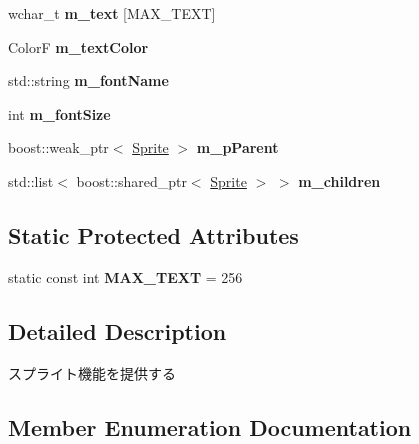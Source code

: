 \begin{DoxyCompactItemize}
\item 
wchar\+\_\+t {\bfseries m\+\_\+text} \mbox{[}M\+A\+X\+\_\+\+T\+E\+XT\mbox{]}\hypertarget{class_sprite_a7e22779568fcb5455c0c95b72e055b27}{}\label{class_sprite_a7e22779568fcb5455c0c95b72e055b27}

\item 
ColorF {\bfseries m\+\_\+text\+Color}\hypertarget{class_sprite_a5715eb71948a9edbd58d0e4bb6f55f3e}{}\label{class_sprite_a5715eb71948a9edbd58d0e4bb6f55f3e}

\item 
std\+::string {\bfseries m\+\_\+font\+Name}\hypertarget{class_sprite_a332be0e92f2fe2dbb72d1590a42af9eb}{}\label{class_sprite_a332be0e92f2fe2dbb72d1590a42af9eb}

\item 
int {\bfseries m\+\_\+font\+Size}\hypertarget{class_sprite_abe9f44c7754c66469f3bd55e626beaa5}{}\label{class_sprite_abe9f44c7754c66469f3bd55e626beaa5}

\item 
boost\+::weak\+\_\+ptr$<$ \hyperlink{class_sprite}{Sprite} $>$ {\bfseries m\+\_\+p\+Parent}\hypertarget{class_sprite_a8f9fc0b824deb7d61fbbdbf8efc471a5}{}\label{class_sprite_a8f9fc0b824deb7d61fbbdbf8efc471a5}

\item 
std\+::list$<$ boost\+::shared\+\_\+ptr$<$ \hyperlink{class_sprite}{Sprite} $>$ $>$ {\bfseries m\+\_\+children}\hypertarget{class_sprite_a3d1fc94c57d9516cdef1a16f73c87e70}{}\label{class_sprite_a3d1fc94c57d9516cdef1a16f73c87e70}

\end{DoxyCompactItemize}
\subsection*{Static Protected Attributes}
\begin{DoxyCompactItemize}
\item 
static const int {\bfseries M\+A\+X\+\_\+\+T\+E\+XT} = 256\hypertarget{class_sprite_afc635126006821982a8dfece2b8acafc}{}\label{class_sprite_afc635126006821982a8dfece2b8acafc}

\end{DoxyCompactItemize}


\subsection{Detailed Description}
スプライト機能を提供する 

\subsection{Member Enumeration Documentation}
